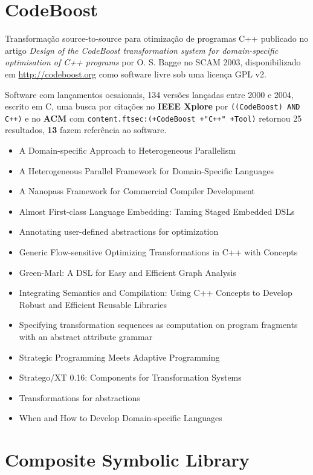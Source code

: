 \section{CodeBoost}

Transformação source-to-source para otimização de programas C++
publicado no artigo {\it Design of the CodeBoost transformation system for domain-specific optimisation of C++ programs}
por O. S. Bagge
no SCAM 2003,
disponibilizado em \url{http://codeboost.org}
como software livre
sob uma licença GPL v2.

Software com lançamentos ocsaionais,
134 versões lançadas
entre 2000 e 2004,
escrito em C,
uma busca por citações no {\bf IEEE Xplore} por
\texttt{((CodeBoost) AND C++)}
e no {\bf ACM} com
\texttt{content.ftsec:(+CodeBoost +"C++" +Tool)}
retornou
25 resultados,
{\bf 13} fazem referência ao software.

\begin{itemize}
\item A Domain-specific Approach to Heterogeneous Parallelism
\item A Heterogeneous Parallel Framework for Domain-Specific Languages
\item A Nanopass Framework for Commercial Compiler Development
\item Almost First-class Language Embedding: Taming Staged Embedded DSLs
\item Annotating user-defined abstractions for optimization
\item Generic Flow-sensitive Optimizing Transformations in C++ with Concepts
\item Green-Marl: A DSL for Easy and Efficient Graph Analysis
\item Integrating Semantics and Compilation: Using C++ Concepts to Develop Robust and Efficient Reusable Libraries
\item Specifying transformation sequences as computation on program fragments with an abstract attribute grammar
\item Strategic Programming Meets Adaptive Programming
\item Stratego/XT 0.16: Components for Transformation Systems
\item Transformations for abstractions
\item When and How to Develop Domain-specific Languages
\end{itemize}

\section{Composite Symbolic Library}


